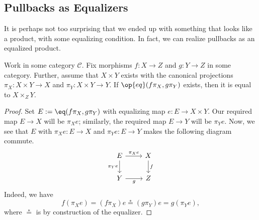 \documentclass[../notes.tex]{subfiles}
\begin{document}
\subsection{Pullbacks as Equalizers}
It is perhaps not too surprising that we ended up with something that looks like a product, with some equalizing condition. In fact, we can realize pullbacks as an equalized product.
\begin{proposition}
	Work in some category $\mathcal C$. Fix morphisms $f:X\to Z$ and $g:Y\to Z$ in some category. Further, assume that $X\times Y$ exists with the canonical projections $\pi_X:X\times Y\to X$ and $\pi_Y:X\times Y\to Y$. If $\op{eq}(f\pi_X,g\pi_Y)$ exists, then it is equal to $X\times_ZY$.
\end{proposition}
\begin{proof}
	Set $E:=\eq(f\pi_X,g\pi_Y)$ with equalizing map $e:E\to X\times Y$. Our required map $E\to X$ will be $\pi_Xe$; similarly, the required map $E\to Y$ will be $\pi_Ye$. Now, we see that $E$ with $\pi_Xe:E\to X$ and $\pi_Ye:E\to Y$ makes the following diagram commute.
	\[\begin{tikzcd}
		E & X \\
		Y & Z
		\arrow["f", from=1-2, to=2-2]
		\arrow["g"', from=2-1, to=2-2]
		\arrow["{\pi_Xe}", from=1-1, to=1-2]
		\arrow["{\pi_Ye}"', from=1-1, to=2-1]
	\end{tikzcd}\]
	Indeed, we have
	\[f(\pi_Xe)=(f\pi_X)e\stackrel*=(g\pi_Y)e=g(\pi_Ye),\]
	where $\stackrel*=$ is by construction of the equalizer.


\end{proof}
\end{document}
